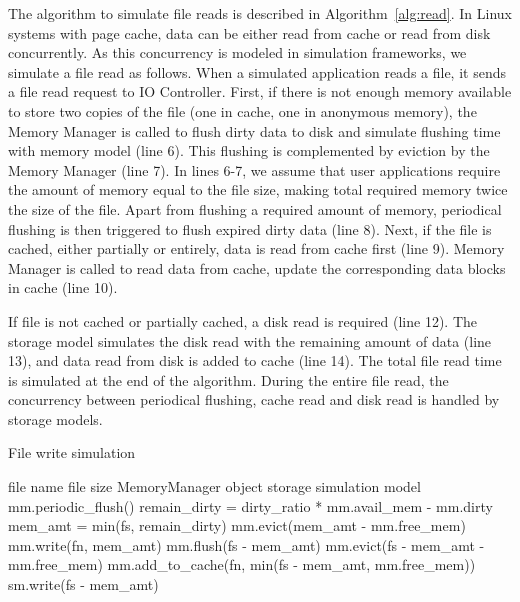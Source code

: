 \documentclass[conference]{IEEEtran}
\newcommand{\Desc}[2]{\State \makebox[2em][l]{#1}#2}
\newcommand{\valerie}[1]{\color{blue}\textbf{From Valerie:}#1\color{black}}
\begin{document}
			The algorithm to simulate file reads is described in Algorithm~\ref{alg:read}.   
			In Linux systems with page cache, data can be either read from cache 
			or read from disk concurrently. As this concurrency is modeled in simulation 
			frameworks, we simulate a file read as follows.
			When a simulated application reads a file, it sends a file read request 
			to IO Controller. 
			First, if there is not enough memory available to store two
			copies of the file (one in cache, one in anonymous memory), the
			Memory Manager is called to flush dirty data to disk and simulate 
			flushing time with memory model (line 6).
			This flushing is complemented by eviction by the Memory Manager (line 7). 
			In lines 6-7, we assume that user applications require the amount of memory 
			equal to the file size, making total required memory twice the size of 
			the file. Apart from flushing a required amount of memory, periodical 
			flushing is then triggered to flush expired dirty data (line 8).
			Next, if the file is cached, either partially or entirely, data is read from 
			cache first (line 9). Memory Manager is called to read data from cache, 
			update the corresponding data blocks in cache (line 10). 
			
			If file is not cached or partially cached, a disk read is required (line 12). 
			The storage model simulates the disk read with the remaining 
            amount of data (line 13), and data read from disk is added to 
            cache (line 14). The total file read time is simulated at the end of the algorithm. 
            During the entire file read, the concurrency between periodical flushing, 
            cache read and disk read is handled by storage models. 

			\begin{algorithm}\caption{File write simulation}\label{alg:write}
				\small
				\begin{algorithmic}[1]
					\Input
        				\Desc{fn}{file name}
        				\Desc{fs}{file size}
						\Desc{mm}{MemoryManager object}
						\Desc{sm}{storage simulation model}
   					\EndInput
   					\State mm.periodic\_flush()
					\State remain\_dirty = dirty\_ratio * mm.avail\_mem - mm.dirty
					\State mem\_amt = min(fs, remain\_dirty)
					 
    					\State mm.evict(mem\_amt - mm.free\_mem)
    					\State mm.write(fn, mem\_amt) 
    				\EndIf
					  
						\State mm.flush(fs - mem\_amt)  
						\State mm.evict(fs - mem\_amt  - mm.free\_mem) 
						\State mm.add\_to\_cache(fn, min(fs - mem\_amt, mm.free\_mem))
						\State sm.write(fs - mem\_amt)
					\EndIf
					
				\end{algorithmic}
			\end{algorithm}
\end{document}
